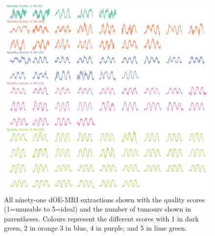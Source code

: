 \begin{figure}[htbp]
   \centering
   \includegraphics[width=\textwidth]{oemri_thesis1/oemri_thesis1-images/fig_scored_extractions.pdf} %
   \caption{All ninety-one \acs{dOE-MRI} extractions shown with the quality scores (1=unusable to 5=ideal) and the number of tumours shown in parentheses.
   Colours represent the different scores with 1 in dark green, 2 in orange 3 in blue, 4 in purple, and 5 in lime green.
   \label{fig_scored_extractions}}
\end{figure}

